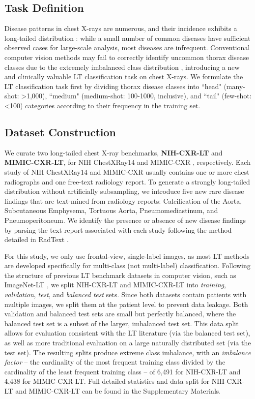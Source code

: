 \documentclass[runningheads]{llncs}
\begin{document}
\subsection{Task Definition}
Disease patterns in chest X-rays are numerous, and their incidence exhibits a long-tailed distribution \cite{Zhou2021Review,Paul2021Zeroshot}: while a small number of common diseases have sufficient observed cases for large-scale analysis, most diseases are infrequent. Conventional computer vision methods may fail to correctly identify uncommon thorax disease classes due to the extremely imbalanced class distribution \cite{Paul2021Zeroshot}, introducing a new and clinically valuable LT classification task on chest X-rays. We formulate the LT classification task first by dividing thorax disease classes into ``head" (many-shot: \textgreater 1,000), ``medium" (medium-shot: 100-1000, inclusive), and ``tail" (few-shot: \textless 100) categories according to their frequency in the training set.

\subsection{Dataset Construction}
We curate two long-tailed chest X-ray benchmarks, \textbf{NIH-CXR-LT} and \textbf{MIMIC-CXR-LT}, for NIH ChestXRay14 \cite{wangchest2017} and MIMIC-CXR \cite{johnson2019mimic}, respectively. Each study of NIH ChestXRay14 and MIMIC-CXR usually contains one or more chest radiographs and one free-text radiology report. To generate a strongly long-tailed distribution without artificially subsampling, we introduce five new rare disease findings that are text-mined from radiology reports: Calcification of the Aorta, Subcutaneous Emphysema, Tortuous Aorta, Pneumomediastinum, and Pneumoperitoneum.
We identify the presence or absence of new disease findings by parsing the text report associated with each study following the method detailed in RadText \cite{Peng2018NegBioAH,wangchest2017}.

For this study, we only use frontal-view, single-label images, as most LT methods are developed specifically for multi-class (not multi-label) classification. Following the structure of previous LT benchmark datasets in computer vision, such as ImageNet-LT \cite{liu2019openlongtailrecognition}, we split NIH-CXR-LT and MIMIC-CXR-LT into \textit{training}, \textit{validation}, \textit{test}, and \textit{balanced test} sets. Since both datasets contain patients with multiple images, we split them at the patient level to prevent data leakage. Both validation and balanced test sets are small but perfectly balanced, where the balanced test set is a subset of the larger, imbalanced test set. This data split allows for evaluation consistent with the LT literature (via the balanced test set), as well as more traditional evaluation on a large naturally distributed set (via the test set). The resulting splits produce extreme class imbalance, with an \textit{imbalance factor} -- the cardinality of the most frequent training class divided by the cardinality of the least frequent training class -- of 6,491 for NIH-CXR-LT and 4,438 for MIMIC-CXR-LT. Full detailed statistics and data split for NIH-CXR-LT and MIMIC-CXR-LT can be found in the Supplementary Materials.
\end{document}
